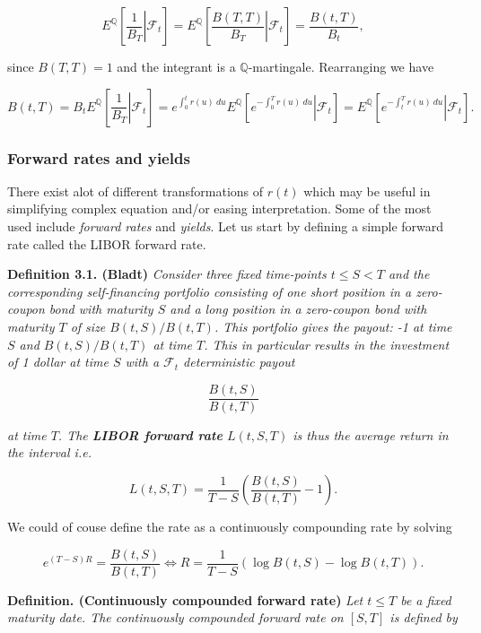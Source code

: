\documentclass[
]{book}
\begin{document}
\[
E^{\mathbb Q}\left[\left.\frac{1}{B_T}\right\vert \mathcal F_t\right]=E^{\mathbb Q}\left[\left.\frac{B(T,T)}{B_T}\right\vert \mathcal F_t\right]=\frac{B(t,T)}{B_t},
\]

since \(B(T,T)=1\) and the integrant is a \(\mathbb Q\)-martingale. Rearranging we have

\[
B(t,T)=B_tE^{\mathbb Q}\left[\left.\frac{1}{B_T}\right\vert \mathcal F_t\right]=e^{\int_0^t r(u)\ du}E^{\mathbb Q}\left[\left.e^{-\int_0^T r(u)\ du}\right\vert \mathcal F_t\right]=E^{\mathbb Q}\left[\left.e^{-\int_t^T r(u)\ du}\right\vert \mathcal F_t\right].\tag{11}
\]

\hypertarget{forward-rates-and-yields}{%
\subsubsection{Forward rates and yields}\label{forward-rates-and-yields}}

There exist alot of different transformations of \(r(t)\) which may be useful in simplifying complex equation and/or easing interpretation. Some of the most used include \emph{forward rates} and \emph{yields}. Let us start by defining a simple forward rate called the LIBOR forward rate.

\textbf{Definition 3.1. (Bladt)} \emph{Consider three fixed time-points \(t\le S< T\) and the corresponding self-financing portfolio consisting of one short position in a zero-coupon bond with maturity \(S\) and a long position in a zero-coupon bond with maturity \(T\) of size \(B(t,S)/B(t,T)\). This portfolio gives the payout: -1 at time \(S\) and \(B(t,S)/B(t,T)\) at time \(T\). This in particular results in the investment of 1 dollar at time \(S\) with a \(\mathcal F_t\) deterministic payout}

\[
\frac{B(t,S)}{B(t,T)}
\]

\emph{at time \(T\). The \textbf{LIBOR forward rate} \(L(t,S,T)\) is thus the average return in the interval i.e.}

\[
L(t,S,T)=\frac{1}{T-S}\left(\frac{B(t,S)}{B(t,T)}-1\right).
\]

We could of couse define the rate as a continuously compounding rate by solving

\[
e^{(T-S)R}=\frac{B(t,S)}{B(t,T)}\iff R=\frac{1}{T-S}\left(\log B(t,S)-\log B(t,T)\right).
\]

\textbf{Definition. (Continuously compounded forward rate)} \emph{Let \(t\le T\) be a fixed maturity date. The continuously compounded forward rate on \([S,T]\) is defined by}
\end{document}

